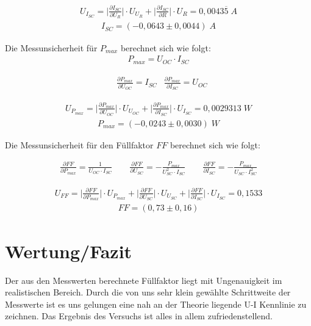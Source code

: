 \documentclass[a4paper]{scrartcl}
\numberwithin{equation}{subsection}
\begin{document}
\begin{align*}
U_{I_{SC}} = \bigg | \frac{\partial I_{SC}}{\partial U_R} \bigg | \cdot U_{U_R} +
\bigg | \frac{\partial I_{SC}}{\partial R} \bigg | \cdot U_R = 0,0043\overline{5} \; A
\end{align*}
\begin{align*}
I_{SC} = (-0,0643 \pm 0,0044)\; A
\end{align*}

Die Messunsicherheit für $P_{max}$ berechnet sich wie folgt:
\begin{align*}
P_{max} = U_{OC} \cdot I_{SC}
\end{align*}

\begin{align}
&\frac{\partial P_{max}}{\partial U_{OC}} = I_{SC}
&\frac{\partial P_{max}}{\partial I_{SC}} = U_{OC}
\end{align}

\begin{align*}
U_{P_{max}} = \bigg | \frac{\partial P_{max}}{\partial U_{OC}} \bigg | \cdot U_{U_{OC}} +
\bigg | \frac{\partial P_{max}}{\partial I_{SC}} \bigg | \cdot U_{I_{SC}} = 0,0029313 \; W
\end{align*}
\begin{align*}
P_{max} = (-0,0243 \pm 0,0030)\; W
\end{align*}

Die Messunsicherheit für den Füllfaktor $FF$ berechnet sich wie folgt:

\begin{align}
\frac{\partial FF}{\partial P_{max}} = \frac{1}{U_{OC} \cdot I_{SC}} \qquad
\frac{\partial FF}{\partial U_{SC}} = -\frac{P_{max}}{U_{SC}^2 \cdot I_{SC}} \qquad
\frac{\partial FF}{\partial I_{SC}} = -\frac{P_{max}}{U_{SC} \cdot I_{SC}^2}
\end{align}

\begin{align*}
U_{FF} = \bigg | \frac{\partial FF}{\partial P_{max}} \bigg | \cdot U_{P_{max}} +
\bigg | \frac{\partial FF}{\partial U_{SC}} \bigg | \cdot U_{U_{SC}} +
\bigg | \frac{\partial FF}{\partial I_{SC}} \bigg | \cdot U_{I_{SC}} = 0,1533
\end{align*}
\begin{align*}
FF = (0,73 \pm 0,16)
\end{align*}

\newpage
\section{Wertung/Fazit}
Der aus den Messwerten berechnete Füllfaktor liegt mit Ungenauigkeit im realistischen
Bereich. Durch die von uns sehr klein gewählte Schrittweite der Messwerte ist es uns
gelungen eine nah an der Theorie liegende U-I Kennlinie zu zeichnen.
Das Ergebnis des Versuchs ist alles in allem zufriedenstellend.
\end{document}
